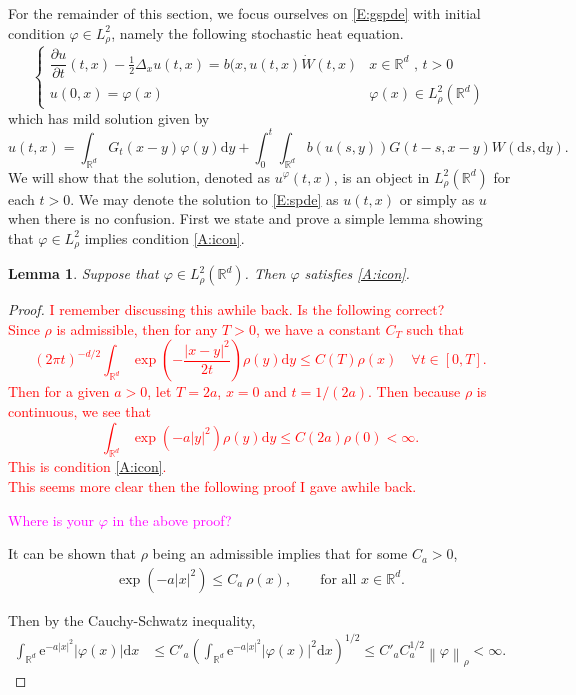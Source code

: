 \documentclass[a4paper,11pt]{article}%
\numberwithin{equation}{section}
\theoremstyle{plain}
\newtheorem{lemma}[theorem]{Lemma}
\theoremstyle{definition}
\newcommand{\R}{\mathbb{R}}
\newcommand{\e}{\mathrm{e}}
\newcommand{\Norm}[1]{\left\|  #1   \right\|}
\newcommand{\ud}{\ensuremath{ \mathrm{d} }}
\begin{document}
For the remainder of this section, we focus ourselves on \eqref{E:gspde} with initial condition $\varphi \in L^2_\rho$,
namely the following stochastic heat equation.
\begin{equation}
	\begin{cases}
	\dfrac{\partial u}{\partial t}(t,x)-\frac{1}{2}\Delta_x u(t,x) = b(x,u(t,x)\dot W(t,x) & \text{$x\in \R^d$ , $t>0$}
	\\ u(0,x)=\varphi(x) & \varphi(x) \in L^2_\rho(\R^d)
	\end{cases}  \label{E:spde}
\end{equation}
which has mild solution given by
\begin{equation}
	u(t,x)=\int_{\R^d}G_t(x-y)\varphi(y)\ud y + \int_0^t\int_{\R^d}b(u(s,y))G(t-s,x-y)W(\ud s,\ud y) \label{E:msol}.
\end{equation}
We will show that the solution, denoted as $u^\varphi(t,x)$, is an object in $L^2_\rho(\R^d)$ for each $t>0$. We may
denote the solution to \eqref{E:spde} as $u(t,x)$ or simply as $u$ when there is no confusion. First we state and prove
a simple lemma showing that $\varphi \in L^2_\rho$ implies condition \eqref{A:icon}.

\begin{lemma}
	\label{L:phi}
	Suppose that $\varphi \in L^2_\rho(\R^d)$. Then $\varphi$ satisfies \eqref{A:icon}.
\end{lemma}

\begin{proof}
		\textcolor{red}
	{
		I remember discussing this awhile back. Is the following correct?
		\\
		Since $\rho$ is admissible, then for any $T>0$, we have a constant $C_T$ such that
		\[
		(2 \pi t )^{-d/2} \int_{\R^d} \exp\left(-\frac{|x-y|^2}{2t}\right)\rho(y) \ud y \le C(T) \rho(x) \quad \forall t \in [0,T].
		\]
		Then for a given $a>0$, let $T=2a$, $x=0$ and $t=1/(2a)$. Then because $\rho$ is continuous, we see that
		\[
		\int_{\R^d} \exp\left(-a|y|^2\right)\rho(y) \ud y \le C(2a) \rho(0) < \infty.
		\]
		This is condition \eqref{A:icon}.
		\\
		This seems more clear then the following proof I gave awhile back.
	}

	\textcolor{magenta}{Where is your $\varphi$ in the above proof?}

	It can be shown that $\rho$ being an admissible implies that for some $C_a>0$,
	\begin{align}
		\label{E:RhoDom}
		\exp\left(-a|x|^2\right)\le C_a\: \rho(x),\qquad \text{for all $x\in\R^d$.}
	\end{align}

	Then by the Cauchy-Schwatz inequality,
	\begin{align*}
		\int_{\R^d} \e^{-a|x|^2} |\varphi(x)|\ud x
		&\le C'_a \left(\int_{\R^d} \e^{-a|x|^2} |\varphi(x)|^2\ud x\right)^{1/2}
		\le C'_a C_a^{1/2} \Norm{\varphi}_\rho<\infty.
	\end{align*}
\end{proof}
\end{document}
